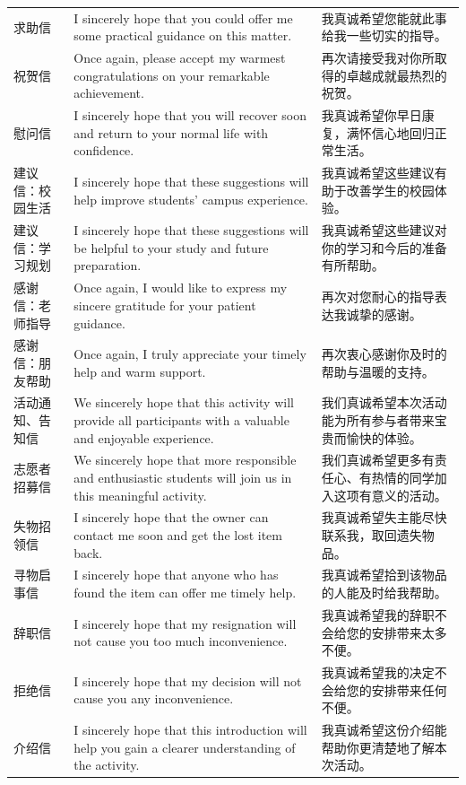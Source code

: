 \documentclass[11pt,a4paper]{ctexart}
\begin{document}
\begin{longtable}{L{2.2cm}L{9.0cm}L{4.7cm}}
求助信 & I sincerely hope that you could offer me some practical guidance on this matter. & 我真诚希望您能就此事给我一些切实的指导。 \\
祝贺信 & Once again, please accept my warmest congratulations on your remarkable achievement. & 再次请接受我对你所取得的卓越成就最热烈的祝贺。 \\
慰问信 & I sincerely hope that you will recover soon and return to your normal life with confidence. & 我真诚希望你早日康复，满怀信心地回归正常生活。 \\
建议信：校园生活 & I sincerely hope that these suggestions will help improve students' campus experience. & 我真诚希望这些建议有助于改善学生的校园体验。 \\
建议信：学习规划 & I sincerely hope that these suggestions will be helpful to your study and future preparation. & 我真诚希望这些建议对你的学习和今后的准备有所帮助。 \\
感谢信：老师指导 & Once again, I would like to express my sincere gratitude for your patient guidance. & 再次对您耐心的指导表达我诚挚的感谢。 \\
感谢信：朋友帮助 & Once again, I truly appreciate your timely help and warm support. & 再次衷心感谢你及时的帮助与温暖的支持。 \\
活动通知、告知信 & We sincerely hope that this activity will provide all participants with a valuable and enjoyable experience. & 我们真诚希望本次活动能为所有参与者带来宝贵而愉快的体验。 \\
志愿者招募信 & We sincerely hope that more responsible and enthusiastic students will join us in this meaningful activity. & 我们真诚希望更多有责任心、有热情的同学加入这项有意义的活动。 \\
失物招领信 & I sincerely hope that the owner can contact me soon and get the lost item back. & 我真诚希望失主能尽快联系我，取回遗失物品。 \\
寻物启事信 & I sincerely hope that anyone who has found the item can offer me timely help. & 我真诚希望拾到该物品的人能及时给我帮助。 \\
辞职信 & I sincerely hope that my resignation will not cause you too much inconvenience. & 我真诚希望我的辞职不会给您的安排带来太多不便。 \\
拒绝信 & I sincerely hope that my decision will not cause you any inconvenience. & 我真诚希望我的决定不会给您的安排带来任何不便。 \\
介绍信 & I sincerely hope that this introduction will help you gain a clearer understanding of the activity. & 我真诚希望这份介绍能帮助你更清楚地了解本次活动。 \\

\end{longtable}
\end{document}

